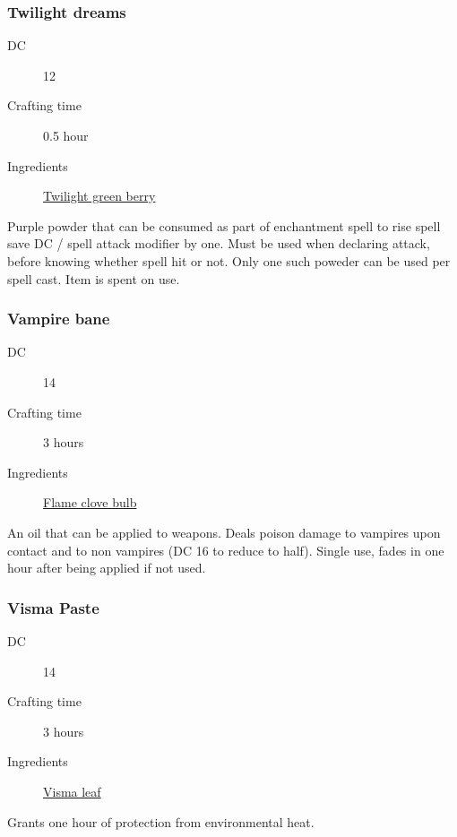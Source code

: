 \subsubsection{Twilight dreams}
\label{Twilight dreams}

\begin{description}
\item [DC] 12 \arcana
\item [Crafting time] 0.5 hour
\item [Ingredients] \hyperref[Twilight Green]{Twilight green berry}
\end{description}

Purple powder that can be consumed as part of enchantment spell to rise  spell save DC / spell attack modifier by one. Must be used when declaring attack, before knowing whether spell hit or not. Only one such poweder can be used per spell cast. Item is spent on use.

\subsubsection{Vampire bane}
\label{Vampire bane}

\begin{description}
\item [DC] 14
\item [Crafting time] 3 hours
\item [Ingredients] \hyperref[Flame clove]{Flame clove bulb}
\end{description}

An oil that can be applied to weapons. Deals  poison damage to vampires upon contact and 
 to non vampires (DC 16 \constitutionsave{} to reduce to half). Single use, fades in one hour after being applied if not used.

\subsubsection{Visma Paste}
\label{Visma Paste}

\begin{description}
\item [DC] 14 \survival
\item [Crafting time] 3 hours
\item [Ingredients] \hyperref[Visma]{Visma leaf}
\end{description}

Grants one hour of protection from environmental heat.

